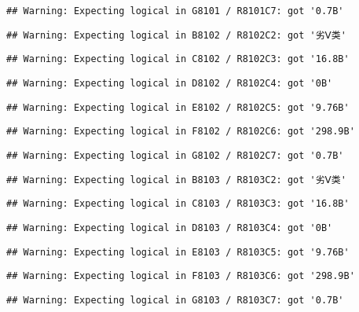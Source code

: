 \documentclass[
]{article}
\begin{document}
\begin{verbatim}
## Warning: Expecting logical in G8101 / R8101C7: got '0.7B'
\end{verbatim}

\begin{verbatim}
## Warning: Expecting logical in B8102 / R8102C2: got '劣Ⅴ类'
\end{verbatim}

\begin{verbatim}
## Warning: Expecting logical in C8102 / R8102C3: got '16.8B'
\end{verbatim}

\begin{verbatim}
## Warning: Expecting logical in D8102 / R8102C4: got '0B'
\end{verbatim}

\begin{verbatim}
## Warning: Expecting logical in E8102 / R8102C5: got '9.76B'
\end{verbatim}

\begin{verbatim}
## Warning: Expecting logical in F8102 / R8102C6: got '298.9B'
\end{verbatim}

\begin{verbatim}
## Warning: Expecting logical in G8102 / R8102C7: got '0.7B'
\end{verbatim}

\begin{verbatim}
## Warning: Expecting logical in B8103 / R8103C2: got '劣Ⅴ类'
\end{verbatim}

\begin{verbatim}
## Warning: Expecting logical in C8103 / R8103C3: got '16.8B'
\end{verbatim}

\begin{verbatim}
## Warning: Expecting logical in D8103 / R8103C4: got '0B'
\end{verbatim}

\begin{verbatim}
## Warning: Expecting logical in E8103 / R8103C5: got '9.76B'
\end{verbatim}

\begin{verbatim}
## Warning: Expecting logical in F8103 / R8103C6: got '298.9B'
\end{verbatim}

\begin{verbatim}
## Warning: Expecting logical in G8103 / R8103C7: got '0.7B'
\end{verbatim}
\end{document}
